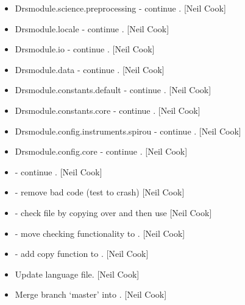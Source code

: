 \documentclass[a4paper,10pt,english]{report}
\begin{document}
\begin{itemize}
\item {} 
Drsmodule.science.preprocessing - continue . {[}Neil Cook{]}

\item {} 
Drsmodule.locale - continue . {[}Neil Cook{]}

\item {} 
Drsmodule.io - continue . {[}Neil Cook{]}

\item {} 
Drsmodule.data - continue . {[}Neil Cook{]}

\item {} 
Drsmodule.constants.default - continue . {[}Neil Cook{]}

\item {} 
Drsmodule.constants.core - continue . {[}Neil Cook{]}

\item {} 
Drsmodule.config.instruments.spirou - continue . {[}Neil Cook{]}

\item {} 
Drsmodule.config.core - continue . {[}Neil Cook{]}

\item {} 
 - continue . {[}Neil Cook{]}

\item {} 
 - remove bad code (test to crash) {[}Neil Cook{]}

\item {} 
 - check file by copying  over 
and then use  {[}Neil Cook{]}

\item {} 
 - move checking functionality to . {[}Neil Cook{]}

\item {} 
 - add copy function to . {[}Neil Cook{]}

\item {} 
Update language file. {[}Neil Cook{]}

\item {} 
Merge branch ‘master’ into . {[}Neil Cook{]}


\end{itemize}
\end{document}

